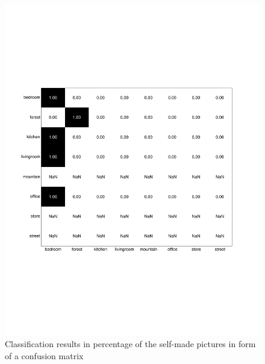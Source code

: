 \documentclass[subfigure,epsfig,fleqn,float,numbers=noenddot]{scrartcl}
\begin{document}
\begin{figure}
		\centering
		\includegraphics[width=\textwidth]{img/conf_matrix_own.pdf}
		\caption{Classification results in percentage of the self-made pictures in form of a confusion matrix}
		\label{fig:conf_matrix_own}
\end{figure}
\end{document}

